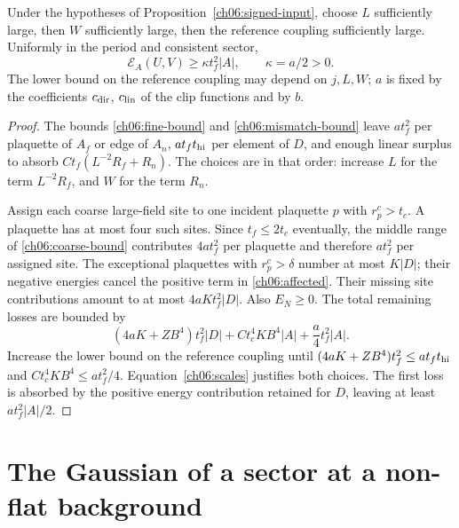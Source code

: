 \begin{proposition}
\label{ch06:energy}
Under the hypotheses of Proposition~\ref{ch06:signed-input}, choose
$L$ sufficiently large, then $W$ sufficiently large, then the reference
coupling sufficiently large. Uniformly in the period and consistent sector,
\[
 \mathcal E_A(U,V)\ge\kappa t_f^2|A|,\qquad \kappa=a/2>0.
\]
The lower bound on the reference coupling may depend on $j,L,W$; $a$ is fixed by the coefficients $c_{\rm dir}$, $c_{\rm lin}$ of the
clip functions and by $b$.
\end{proposition}
\begin{proof}
The bounds \eqref{ch06:fine-bound} and \eqref{ch06:mismatch-bound} leave
$a t_f^2$ per plaquette of $A_f$ or edge of $A_n$, $a t_ft_{\rm hi}$ per element
of $D$, and enough linear surplus to absorb
$Ct_f(L^{-2}R_f+R_n)$. The choices are in that order: increase $L$ for
the term $L^{-2}R_f$, and $W$ for the term $R_n$.

Assign each coarse large-field site to one incident plaquette $p$ with $r_p^c>t_c$. A plaquette has at most four such sites. Since $t_f\le2t_c$
eventually, the middle range of \eqref{ch06:coarse-bound} contributes
$4at_f^2$ per plaquette and therefore $at_f^2$ per assigned site. The
exceptional plaquettes with $r_p^c>\delta$ number at most $K|D|$;
their negative energies cancel the positive term in
\eqref{ch06:affected}. Their missing site contributions amount to at most
$4aKt_f^2|D|$. Also $E_N\ge0$. The total remaining losses are bounded by
\[
 (4aK+ZB^4)t_f^2|D|+Ct_c^4KB^4|A|+\frac a4t_f^2|A|.
\]
Increase the lower bound on the reference coupling until
$(4aK+ZB^4)t_f^2\le at_ft_{\rm hi}$ and
$Ct_c^4KB^4\le at_f^2/4$. Equation~\eqref{ch06:scales} justifies both
choices. The first loss is absorbed by the positive energy contribution retained for $D$, leaving
at least $at_f^2|A|/2$.
\end{proof}

\section{The Gaussian of a sector at a non-flat background}
\label{ch06:sector}

